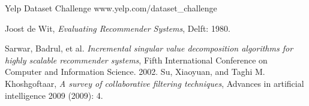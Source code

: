 \documentclass[conference]{IEEEtran}
\begin{document}
\medskip
 
\begin{thebibliography}{9}
Yelp Dataset Challenge www.yelp.com/dataset\_challenge

Joost de Wit, \emph{Evaluating Recommender Systems}, Delft: 1980.

Sarwar, Badrul, et al.  \emph{Incremental singular value decomposition algorithms for highly scalable recommender systems}, Fifth International Conference on Computer and Information Science. 2002.
Su, Xiaoyuan, and Taghi M. Khoshgoftaar, \emph{A survey of collaborative filtering techniques}, Advances in artificial intelligence 2009 (2009): 4.

\end{thebibliography}
\end{document}
